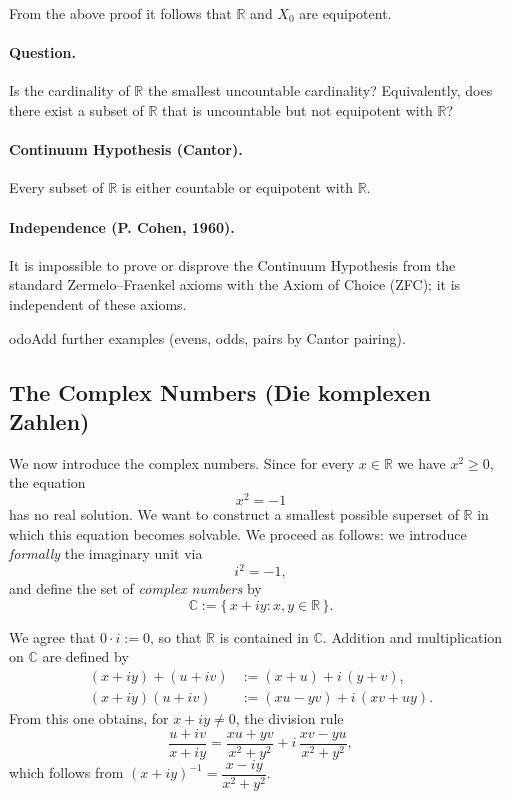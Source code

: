 \documentclass[12pt,a4paper]{article}
\newcommand{\R}{\mathbb{R}}
\newcommand{\C}{\mathbb{C}}
\theoremstyle{plain}
\theoremstyle{definition}
\theoremstyle{remark}
\begin{document}
From the above proof it follows that $\R$ and $X_0$ are equipotent.

\paragraph{Question.} Is the cardinality of $\R$ the smallest uncountable cardinality? Equivalently, does there exist a subset of $\R$ that is uncountable but not equipotent with $\R$?

\paragraph{Continuum Hypothesis (Cantor).} Every subset of $\R$ is either countable or equipotent with $\R$.

\paragraph{Independence (P. Cohen, 1960).} It is impossible to prove or disprove the Continuum Hypothesis from the standard Zermelo–Fraenkel axioms with the Axiom of Choice (ZFC); it is independent of these axioms.

	odo{Add further examples (evens, odds, pairs by Cantor pairing).}

\subsection{The Complex Numbers (Die komplexen Zahlen)}\label{subsec:complex-numbers}

We now introduce the complex numbers. Since for every $x\in \R$ we have $x^2\ge 0$, the equation
\[
	x^2=-1
\]
has no real solution. We want to construct a smallest possible superset of $\R$ in which this equation becomes solvable. We proceed as follows: we introduce \emph{formally} the imaginary unit via
\[
	i^2=-1,
\]
and define the set of \emph{complex numbers} by
\[
	\C := \{\, x+iy : x,y\in \R \,\}.
\]

We agree that $0\cdot i:=0$, so that $\R$ is contained in $\C$. Addition and multiplication on $\C$ are defined by
\begin{align*}
	(x+iy)+(u+iv) &:= (x+u) + i\,(y+v),\\
	(x+iy)(u+iv) &:= (xu - yv) + i\,(xv + uy).
\end{align*}
From this one obtains, for $x+iy\ne 0$, the division rule
\[
	\frac{u+iv}{x+iy}
	 = \frac{xu+yv}{x^2+y^2} 
		 + i\,\frac{xv-yu}{x^2+y^2},
\]
which follows from $(x+iy)^{-1}=\dfrac{x-iy}{x^2+y^2}$.
\end{document}
